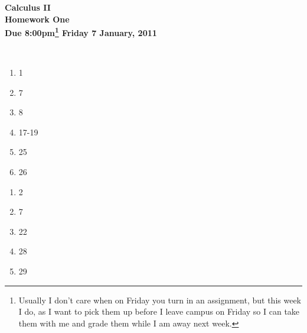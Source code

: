\documentclass[12pt]{article}
\begin{document}
\pagestyle{empty}
 
\begin{center}
{\large {\bf Calculus II}}\\
\medskip
{\large {\bf Homework One}}\\
\medskip
{ {\bf Due 8:00pm\footnote{Usually I don't care when on Friday you
      turn in an assignment, but this week I do, as I want to pick
      them up before I leave campus on Friday so I can take them with
      me and grade them while I am away next week.} Friday 7 January,
    2011}}\\ 
\end{center}

\hspace{2mm}\\


\begin{enumerate}
\setlength{\itemsep}{-1mm}
  \item 1
  \item 7
  \item 8
  \item 17-19
  \item 25
  \item 26 

\end{enumerate}



\begin{enumerate}
\setlength{\itemsep}{-1mm}
  \item 2
  \item 7
  \item 22
  \item 28
  \item 29

\end{enumerate}
\end{document}
